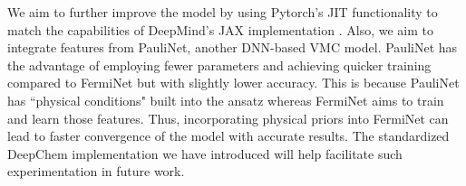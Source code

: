\documentclass[letterpaper]{article} %
\begin{document}
We aim to further improve the model by using Pytorch's JIT functionality to match the capabilities of DeepMind's JAX implementation \cite{spencer2020better}. Also, we aim to integrate features from PauliNet\cite{10.1063/5.0157512}, another DNN-based VMC model. PauliNet has the advantage of employing fewer parameters and achieving quicker training compared to FermiNet but with slightly lower accuracy. This is because PauliNet has ``physical conditions" built into the ansatz whereas FermiNet aims to train and learn those features. Thus, incorporating physical priors into FermiNet can lead to faster convergence of the model with accurate results. The standardized DeepChem implementation we have introduced will help facilitate such experimentation in future work.


\clearpage

\end{document}
